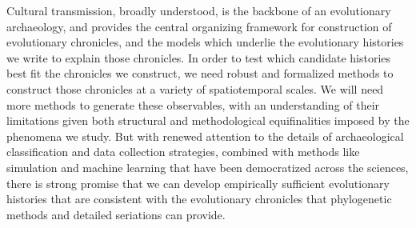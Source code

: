 Cultural transmission, broadly understood, is the backbone of an evolutionary archaeology, and provides the central organizing framework for construction of evolutionary chronicles, and the models which underlie the evolutionary histories we write to explain those chronicles.  In order to test which candidate histories best fit the chronicles we construct, we need robust and formalized methods to construct those chronicles at a variety of spatiotemporal scales.  We will need more methods to generate these observables, with an understanding of their limitations given both structural and methodological equifinalities imposed by the phenomena we study.   But with renewed attention to the details of archaeological classification and data collection strategies, combined with methods like simulation and machine learning that have been democratized across the sciences, there is strong promise that we can develop empirically sufficient evolutionary histories that are consistent with the evolutionary chronicles that phylogenetic methods and detailed seriations can provide.  

